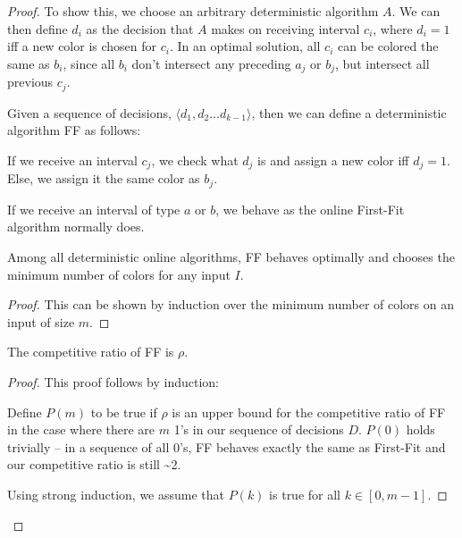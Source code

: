 \begin{proof}
To show this, we choose an arbitrary deterministic algorithm $A$. We can then define $d_i$ as the decision that $A$ makes on receiving interval $c_i$, where $d_i = 1$ iff a new color is chosen for $c_i$.  In an optimal solution, all $c_i$ can be colored the same as $b_i$, since all $b_i$ don't intersect any preceding $a_j$ or $b_j$, but intersect all previous $c_j$.  

Given a sequence of decisions, $\langle d_1, d_2...d_{k-1} \rangle$, then we can define a deterministic algorithm FF as follows:

If we receive an interval $c_j$, we check what $d_j$ is and assign a new color iff $d_j = 1$. Else, we assign it the same color as $b_j$. 

If we receive an interval of type $a$ or $b$, we behave as the online First-Fit algorithm normally does.

\begin{lemma} Among all deterministic online algorithms, FF behaves optimally and chooses the minimum number of colors for any input $I$. \end{lemma}
\begin{proof}
This can be shown by induction over the minimum number of colors on an input of size $m$. 
\end{proof}

\begin{lemma} The competitive ratio of FF is $\rho$. \end{lemma}
\begin{proof}
This proof follows by induction:

Define $P(m)$ to be true if $\rho$ is an upper bound for the competitive ratio of FF in the case where there are $m$ 1's in our sequence of decisions $D$.  $P(0)$ holds trivially -- in a sequence of all 0's, FF behaves exactly the same as First-Fit and our competitive ratio is still \textasciitilde2.

Using strong induction, we assume that $P(k)$ is true for all $k \in [0,m-1]$.  



\end{proof}
\end{proof}
